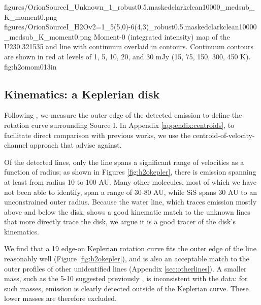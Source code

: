 \documentclass[twocolumn]{aastex61}
\begin{document}
\FigureTwo
{{figures/OrionSourceI_Unknown_1_robust0.5.maskedclarkclean10000_medsub_K_moment0}.png}
{{figures/OrionSourceI_H2Ov2=1_5(5,0)-6(4,3)_robust0.5.maskedclarkclean10000_medsub_K_moment0}.png}
{Moment-0 (integrated intensity) map of the U230.321535 and \water line with continuum overlaid
in contours.  Continuum contours are shown in red at levels of 1, 5, 10, 20, and 30
mJy \perbeam (15, 75, 150, 300, 450 K).
}
{fig:h2omom0}{1}{3in}

\subsection{Kinematics: a Keplerian disk}
\label{sec:kinematics}
Following \citet{Seifried2016a}, we measure the outer edge of the detected
emission to define the rotation curve surrounding Source I.  In Appendix
\ref{appendix:centroids}, to facilitate direct comparison with previous works,
we use the centroid-of-velocity-channel approach that \citet{Seifried2016a}
advise against.

Of the detected lines, only the \water line spans a significant range of
velocities as a function of radius; as shown in Figures \ref{fig:h2okepler},
there is \water emission spanning at least from radius 10 to 100 AU.  Many
other molecules, most of
which we have not been able to identify, span a range of 30-80 AU, while SiS
spans 30 AU to an unconstrained outer radius.  Because the water line,
which traces emission mostly above and below the disk, shows a good kinematic
match to the unknown lines that more directly trace the disk, we argue it is
a good tracer of the disk's kinematics.

We find that a 19 \msun edge-on Keplerian rotation curve fits the outer edge of
the \water line reasonably well (Figure \ref{fig:h2okepler}), and is also an
acceptable match to the outer profiles of other unidentified lines
(Appendix \ref{sec:otherlines}).  A smaller mass, such as
the 5-10 \msun suggested previously \citep{Plambeck2016a,Hirota2014a}, is
inconsistent with the data: for such masses, emission is clearly detected
outside of the Keplerian curve.  These lower masses are therefore excluded.  
\end{document}
